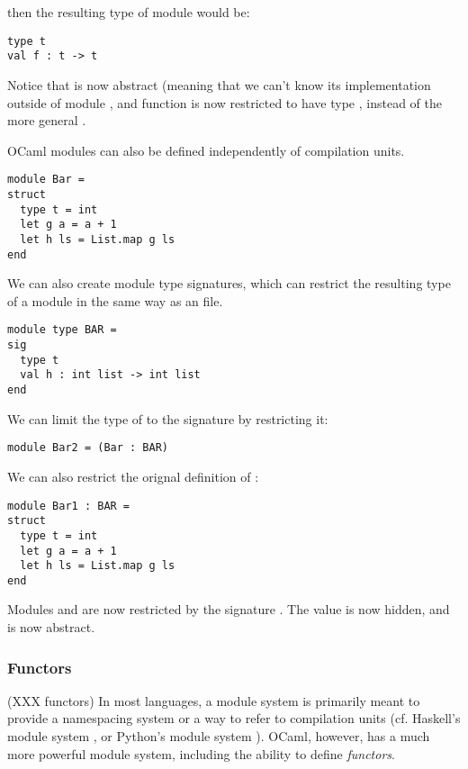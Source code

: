 

then the resulting type of module  would be:

\begin{lstlisting}
type t
val f : t -> t
\end{lstlisting}

Notice that  is now abstract (meaning that we can't know
its implementation outside of module , and function 
is now restricted to have type , instead of the more
general .

OCaml modules can also be defined independently of compilation
units.

\begin{lstlisting}
module Bar =
struct
  type t = int
  let g a = a + 1
  let h ls = List.map g ls
end
\end{lstlisting}

We can also create module type signatures, which can restrict the
resulting type of a module in the same way as an  file.

\begin{lstlisting}
module type BAR =
sig
  type t
  val h : int list -> int list
end
\end{lstlisting}

We can limit the type of  to the signature
 by restricting it:

\begin{lstlisting}
module Bar2 = (Bar : BAR)
\end{lstlisting}

We can also restrict the orignal definition of :

\begin{lstlisting}
module Bar1 : BAR =
struct
  type t = int
  let g a = a + 1
  let h ls = List.map g ls
end
\end{lstlisting}

Modules  and  are now restricted by the
signature . The value  is now hidden, and
 is now abstract.

\subsubsection{Functors}

(XXX functors) In most languages, a module system is primarily meant
to provide a namespacing system or a way to refer to compilation units
(cf. Haskell's module system \cite{www:haskell:modules}, or Python's
module system \cite{www:python:modules}). OCaml, however, has a much
more powerful module system, including the ability to define
\textit{functors}.

